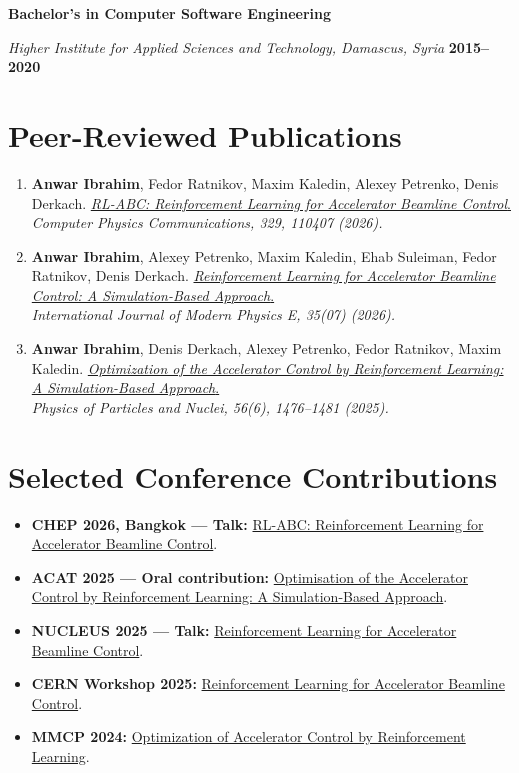 \documentclass[10pt,a4paper]{article}
\newcommand{\entry}[4]{%
  \textbf{#1}\par
  {\textit{\color{muted}#2\if\relax\detokenize{#3}\relax\else, #3\fi} \textcolor{rule}{\textbar} \textbf{#4}}\par\vspace{-2pt}
}
\newcommand{\publication}[3]{%
  #1 #2\\[-1pt]
  \textit{#3}
}
\begin{document}
\entry{Bachelor's in Computer Software Engineering}{Higher Institute for Applied Sciences and Technology}{Damascus, Syria}{2015--2020}

\newpage
\section{Peer-Reviewed Publications}
\begin{enumerate}
  \item \publication{\textbf{Anwar Ibrahim}, Fedor Ratnikov, Maxim Kaledin, Alexey Petrenko, Denis Derkach.}{\href{https://doi.org/10.1016/j.cpc.2026.110407}{\textit{RL-ABC: Reinforcement Learning for Accelerator Beamline Control}.}}{Computer Physics Communications, 329, 110407 (2026).}

  \item \publication{\textbf{Anwar Ibrahim}, Alexey Petrenko, Maxim Kaledin, Ehab Suleiman, Fedor Ratnikov, Denis Derkach.}{\href{https://doi.org/10.1142/S0218301326410272}{\textit{Reinforcement Learning for Accelerator Beamline Control: A Simulation-Based Approach}.}}{International Journal of Modern Physics E, 35(07) (2026).}

  \item \publication{\textbf{Anwar Ibrahim}, Denis Derkach, Alexey Petrenko, Fedor Ratnikov, Maxim Kaledin.}{\href{https://doi.org/10.1134/S1063779625700716}{\textit{Optimization of the Accelerator Control by Reinforcement Learning: A Simulation-Based Approach}.}}{Physics of Particles and Nuclei, 56(6), 1476--1481 (2025).}
\end{enumerate}

\section{Selected Conference Contributions}
\begin{itemize}
  \item \textbf{CHEP 2026, Bangkok --- Talk:} \href{https://indico.cern.ch/event/1471803/contributions/6966806/}{RL-ABC: Reinforcement Learning for Accelerator Beamline Control}.
  \item \textbf{ACAT 2025 --- Oral contribution:} \href{https://indico.cern.ch/event/1488410/contributions/6562827/}{Optimisation of the Accelerator Control by Reinforcement Learning: A Simulation-Based Approach}.
  \item \textbf{NUCLEUS 2025 --- Talk:} \href{https://indico.spbu.ru/event/1/contributions/171/}{Reinforcement Learning for Accelerator Beamline Control}.
  \item \textbf{CERN Workshop 2025:} \href{https://indico.cern.ch/event/1502120/contributions/6505973/}{Reinforcement Learning for Accelerator Beamline Control}.
  \item \textbf{MMCP 2024:} \href{https://indico.jinr.ru/event/4467/contributions/28919/}{Optimization of Accelerator Control by Reinforcement Learning}.
\end{itemize}
\end{document}
